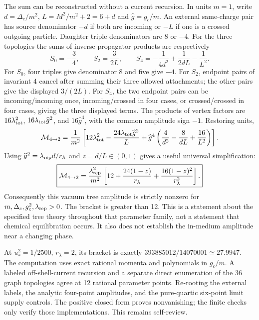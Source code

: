 \documentclass[11pt]{article}
\newcommand{\lt}{\lambda_{\rm tot}}
\begin{document}
The sum can be reconstructed without a current recursion. In units $m=1$,
write $d=\Delta_c/m^2$, $L=M^2/m^2+2=6+d$ and $\widehat g=g_c/m$.
An external same-charge pair has source denominator $-d$ if both are
incoming or $-L$ if one is a crossed outgoing particle. Daughter triple
denominators are $8$ or $-4$. For the three topologies the sums of inverse
propagator products are respectively
\begin{equation}
 S_0=-\frac34,\qquad S_2=\frac{3}{2L},\qquad
 S_4=-\frac{1}{4d^2}+\frac{1}{2dL}-\frac{1}{L^2}.
\end{equation}
For $S_0$, four triples give denominator $8$ and five give $-4$.
For $S_2$, endpoint pairs of invariant $4$ cancel after summing their
three allowed attachments; the other pairs give the displayed $3/(2L)$.
For $S_4$, the two endpoint pairs can be incoming/incoming once,
incoming/crossed in four cases, or crossed/crossed in four cases,
giving the three displayed terms. The products of vertex factors are
$16\lt^2$, $16\lt\widehat g^2$, and $16\widehat g^4$, with the
common amplitude sign $-1$. Restoring units,
\begin{equation}
 \mathcal M_{4\to2}=\frac1{m^2}\left[
 12\lt^2-\frac{24\lt\widehat g^2}{L}
 +\widehat g^4\left(\frac4{d^2}-\frac8{dL}+\frac{16}{L^2}\right)
 \right].
\end{equation}
Using $\widehat g^2=\lambda_{\rm rep}d/r_\lambda$ and
$z=d/L\in(0,1)$ gives a useful universal simplification:
\begin{equation}
 \boxed{\mathcal M_{4\to2}
 =\frac{\lambda_{\rm rep}^2}{m^2}
 \left[12+\frac{24(1-z)}{r_\lambda}
 +\frac{16(1-z)^2}{r_\lambda^2}\right].}
\label{eq:six}
\end{equation}
Consequently this vacuum tree amplitude is strictly nonzero for
$m,\Delta_c,g_c^2,\lambda_{\rm rep}>0$. The bracket is greater than 12.
This is a statement about the specified tree theory throughout that
parameter family, not a statement that chemical equilibration occurs.
It also does not establish the in-medium amplitude near a changing phase.

At $u_*^2=1/2500$, $r_\lambda=2$, its bracket is exactly
$393885012/14070001\simeq27.9947$. The computation uses exact rational
momenta and polynomials in $g_c/m$. A labeled off-shell-current recursion
and a separate direct enumeration of the 36 graph topologies agree at
12 rational parameter points. Re-rooting the external labels, the analytic
four-point amplitudes, and the pure-quartic six-point limit supply controls.
The positive closed form proves nonvanishing; the finite checks only
verify those implementations. This remains self-review.
\end{document}
